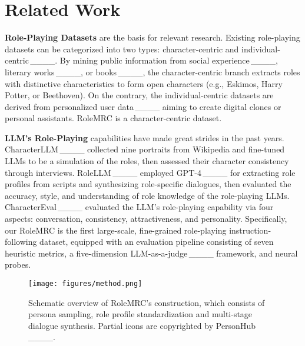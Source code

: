 \section{Related Work}
\label{sec:literature}

\noindent \textbf{Role-Playing Datasets} are the basis for relevant research. Existing role-playing datasets can be categorized into two types: character-centric and individual-centric\,____. By mining public information from social experience\,____, literary works\,____, or books\,____, the character-centric branch extracts roles with distinctive characteristics to form open characters (e.g., Eskimos, Harry Potter, or Beethoven). On the contrary, the individual-centric datasets are derived from personalized user data\,____ aiming to create digital clones or personal assistants. RoleMRC is a character-centric dataset.

\noindent \textbf{LLM's Role-Playing} capabilities have made great strides in the past years. CharacterLLM\,____ collected nine portraits from Wikipedia and fine-tuned LLMs to be a simulation of the roles, then assessed their character consistency through interviews. RoleLLM\,____ employed GPT-4\,____ for extracting role profiles from scripts and synthesizing role-specific dialogues, then evaluated the accuracy, style, and understanding of role knowledge of the role-playing LLMs. CharacterEval\,____ evaluated the LLM's role-playing capability via four aspects: conversation, consistency, attractiveness, and personality. Specifically, our RoleMRC is the first large-scale, fine-grained role-playing instruction-following dataset, equipped with an evaluation pipeline consisting of seven heuristic metrics, a five-dimension LLM-as-a-judge\,____ framework, and neural probes.

\begin{figure*}[t]
    \centering
    \texttt{[image: figures/method.png]}
    \vspace{-6mm}
    \caption{Schematic overview of RoleMRC's construction, which consists of persona sampling, role profile standardization and multi-stage dialogue synthesis. Partial icons are copyrighted by PersonHub\,____.}
    \label{fig:method}
    \vspace{-3mm}
\end{figure*}